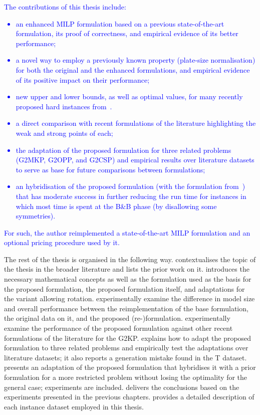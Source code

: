 \documentclass[ppgc,tese,english,formais,babel]{iiufrgs}
\newif\iffinalversion
\newcommand{\newtext}[1]{\iffinalversion%
#1%
\else%
\textcolor{blue}{#1}%
\fi%
}
\begin{document}
\newtext{
The contributions of this thesis include:
\begin{itemize}
\item an enhanced MILP formulation based on a previous state-of-the-art formulation, its proof of correctness, and empirical evidence of its better performance;
\item a novel way to employ a previously known property (plate-size normalisation) for both the original and the enhanced formulations, and empirical evidence of its positive impact on their performance;
\item new upper and lower bounds, as well as optimal values, for many recently proposed hard instances from~\citet{velasco:2019}.
\item a direct comparison with recent formulations of the literature highlighting the weak and strong points of each;
\item the adaptation of the proposed formulation for three related problems (G2MKP, G2OPP, and G2CSP) and empirical results over literature datasets to serve as base for future comparisons between formulations;
\item an hybridisation of the proposed formulation (with the formulation from~\citet{silva:2010}) that has moderate success in further reducing the run time for instances in which most time is spent at the B\&B phase (by disallowing some symmetries).
\end{itemize}
For such, the author reimplemented a state-of-the-art MILP formulation and an optional pricing procedure used by it.
}

The rest of the thesis is organised in the following way.
 contextualises the topic of the thesis in the broader literature and lists the prior work on it.
 introduces the necessary mathematical concepts as well as the formulation used as the basis for the proposed formulation, the proposed formulation itself, and adaptations for the variant allowing rotation.
 experimentally examine the difference in model size and overall performance between the reimplementation of the base formulation, the original data on it, and the proposed (re-)formulation.
 experimentally examine the performance of the proposed formulation against other recent formulations of the literature for the G2KP.
 explains how to adapt the proposed formulation to three related problems and empirically test the adaptations over literature datasets; it also reports a generation mistake found in the T dataset.
 presents an adaptation of the proposed formulation that hybridises it with a prior formulation for a more restricted problem without losing the optimality for the general case; experiments are included.
 delivers the conclusions based on the experiments presented in the previous chapters.
 provides a detailed description of each instance dataset employed in this thesis.
\end{document}
